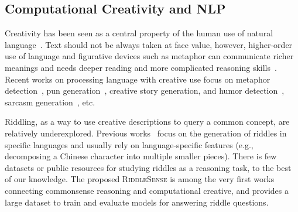 \subsection*{Computational Creativity and NLP}
Creativity has been seen as a central property of the human use of natural language~\cite{mcdonald1994creative}.
Text should not be always taken at face value, however, higher-order use of language and figurative devices such as metaphor can communicate richer meanings and needs deeper reading and more complicated reasoning skills~\cite{veale2011creative}.
Recent works on processing language with creative use focus on metaphor detection~\cite{gao2018neural}, pun generation~\cite{He2019PunGW, Luo2019PunGANGA}, creative story generation, and humor detection~\cite{Weller2019HumorDA, Weller2020TheRD}, sarcasm generation~\cite{chakrabarty2020r}, etc. 

Riddling, as a way to use creative descriptions to query a common concept, are relatively underexplored.
Previous works~\cite{tan2016solving, oliveira2018exploring} focus on the generation of riddles in specific languages and usually rely on language-specific features (e.g., decomposing a Chinese character into multiple smaller pieces).
There is few datasets or public resources for studying riddles as a reasoning task, to the best of our knowledge. 
The proposed \textsc{RiddleSense} is among the very first works connecting commonsense reasoning and computational creative, and provides a large dataset to train and evaluate models for answering riddle questions.



